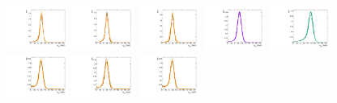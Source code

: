 \begin{figure}[htbp]
  \centering
  \includegraphics[width=0.18\textwidth]{fig/analysis/templateSignalVsMX_fromDC_GbuToWW_MJJ_mu_HP_bb_DEtaHi.pdf}
  \includegraphics[width=0.18\textwidth]{fig/analysis/templateSignalVsMX_fromDC_RadToWW_MJJ_mu_HP_bb_DEtaHi.pdf}
  \includegraphics[width=0.18\textwidth]{fig/analysis/templateSignalVsMX_fromDC_ZprToWW_MJJ_mu_HP_bb_DEtaHi.pdf}
  \includegraphics[width=0.18\textwidth]{fig/analysis/templateSignalVsMX_fromDC_WprToWZ_MJJ_mu_HP_bb_DEtaHi.pdf}
  \includegraphics[width=0.18\textwidth]{fig/analysis/templateSignalVsMX_fromDC_WprToWH_MJJ_mu_HP_bb_DEtaHi.pdf}\\
  \includegraphics[width=0.18\textwidth]{fig/analysis/templateSignalVsMX_fromDC_GbuToWW_MJJ_mu_LP_bb_DEtaHi.pdf}
  \includegraphics[width=0.18\textwidth]{fig/analysis/templateSignalVsMX_fromDC_RadToWW_MJJ_mu_LP_bb_DEtaHi.pdf}
  \includegraphics[width=0.18\textwidth]{fig/analysis/templateSignalVsMX_fromDC_ZprToWW_MJJ_mu_LP_bb_DEtaHi.pdf}

\end{figure}
